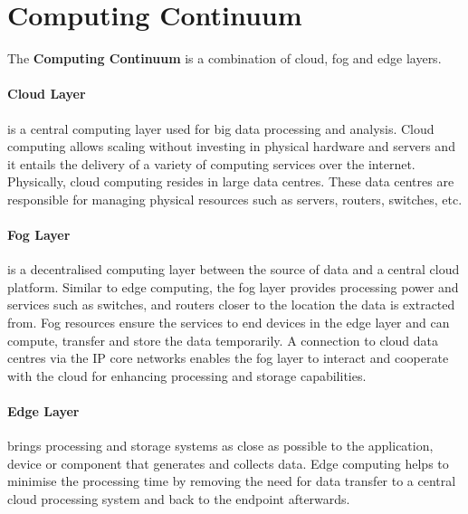 



    \section{Computing Continuum}
    \label{sec:computing-continuum-background}

        The \textbf{Computing Continuum} is a combination of cloud, fog and edge layers.

        \paragraph{Cloud Layer }
        \label{par:cloud-layer-continuum}

            is a central computing layer used for big data processing and analysis.
            Cloud computing allows scaling without investing in physical hardware and servers and it entails the delivery of a variety of computing services over the internet. Physically, cloud computing resides in large data centres. These data centres are responsible for managing physical resources such as servers, routers, switches, etc.

        \paragraph{Fog Layer }
        \label{par:fog-layer-continuum}

            is a decentralised computing layer between the source of data and a central cloud platform. Similar to edge computing, the fog layer provides processing power and services such as switches, and routers closer to the location the data is extracted from. Fog resources ensure the services to end devices in the edge layer and can compute, transfer and store the data temporarily. A connection to cloud data centres via the IP core networks enables the fog layer to interact and cooperate with the cloud for enhancing processing and storage capabilities.


        \paragraph{Edge Layer }
        \label{par:edge-layer-continuum}

            brings processing and storage systems as close as possible to the application, device or component that generates and collects data.
            Edge computing helps to minimise the processing time by removing the need for data transfer to a central cloud processing system and back to the endpoint afterwards.




